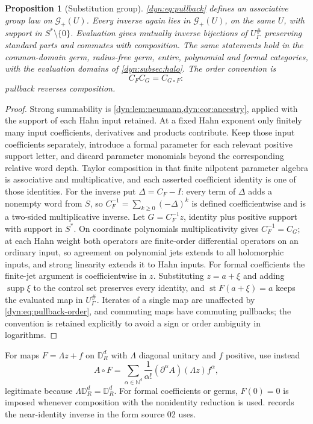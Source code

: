 \documentclass[11pt,letterpaper]{article}
\newtheorem{proposition}[proposition]{Proposition}
\theoremstyle{definition}
\theoremstyle{remark}
\newcommand{\N}{\mathbb N}
\newcommand{\GG}{\mathscr G}
\newcommand{\supp}{\operatorname{supp}}
\newcommand{\st}{\operatorname{st}}
\numberwithin{equation}{section}
\begin{document}
\begin{proposition}[Substitution group]\label{dyn:prop:subgroup}
\eqref{dyn:eq:pullback} defines an associative group law on $\GG_+(U)$.
Every inverse again lies in $\GG_+(U)$, on the same $U$, with support in
$S^{*}\setminus\{0\}$. Evaluation gives mutually inverse bijections of
$U^{\#}_\Gamma$ preserving standard parts and commutes with composition.
The same statements hold in the common-domain germ, radius-free germ,
entire, polynomial and formal categories, with the evaluation domains of
\cref{dyn:subsec:halo}. The order convention is
\begin{equation}\label{dyn:eq:pullback-order}
 C_FC_G=C_{G\circ F}:
\end{equation}
pullback reverses composition.
\end{proposition}
\begin{proof}
Strong summability is \cref{dyn:lem:neumann,dyn:cor:ancestry}, applied
with the support of each Hahn input retained. At a fixed Hahn exponent
only finitely many input coefficients, derivatives and products contribute.
Keep those input coefficients separately, introduce a formal parameter for
each relevant positive support letter, and discard parameter monomials
beyond the corresponding relative word depth. Taylor composition in that
finite nilpotent parameter algebra is associative and multiplicative, and
each asserted coefficient identity is
one of those identities. For the inverse put $\Delta=C_F-I$: every term of
$\Delta$ adds a nonempty word from $S$, so $C_F^{-1}=\sum_{k\ge0}(-\Delta)^{k}$
is defined coefficientwise and is a two-sided multiplicative inverse. Let
$G=C_F^{-1}z$, identity plus positive support with support in $S^{*}$. On
coordinate polynomials multiplicativity gives $C_F^{-1}=C_G$; at each Hahn
weight both operators are finite-order differential operators on an
ordinary input, so agreement on polynomial jets extends to all holomorphic
inputs, and strong linearity extends it to Hahn inputs. For formal
coefficients the finite-jet argument is coefficientwise in $z$.
Substituting $z=a+\xi$ and adding $\supp\xi$ to the control set preserves
every identity, and $\st F(a+\xi)=a$ keeps the evaluated map in
$U^{\#}_\Gamma$. Iterates of a single map are unaffected by
\eqref{dyn:eq:pullback-order}, and commuting maps have commuting pullbacks;
the convention is retained explicitly to avoid a sign or order ambiguity in
logarithms.
\end{proof}

For maps $F=\Lambda z+f$ on $\mathbb D_R^{d}$ with $\Lambda$ diagonal
unitary and $f$ positive, use instead
\begin{equation}\label{dyn:eq:rotation-substitution}
 A\circ F=\sum_{\alpha\in\N^{d}}\frac1{\alpha!}(\partial^{\alpha}A)(\Lambda z)f^{\alpha},
\end{equation}
legitimate because $\Lambda\mathbb D_R^{d}=\mathbb D_R^{d}$. For formal
coefficients or germs, $F(0)=0$ is imposed whenever composition with the
nonidentity reduction is used.  records the
near-identity inverse in the form source 02 uses.
\end{document}
